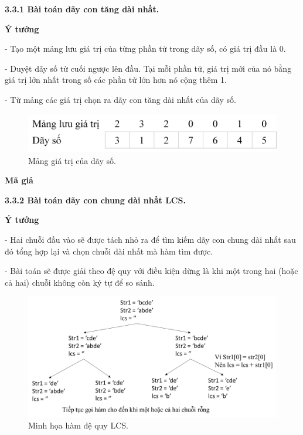 \setlength{\parindent}{0.5cm}
\textbf{3.3.1 Bài toán dãy con tăng dài nhất.}

\smallskip
{}
\changefontsizes{13pt}
\textbf{Ý tưởng}


\setlength{\parindent}{0cm}
- Tạo một mảng lưu giá trị của từng phần tử trong dãy số, có giá trị đầu là 0.

- Duyệt dãy số từ cuối ngược lên đầu. Tại mỗi phần tử, giá trị mới của nó bằng giá trị lớn nhất trong số các phần tử lớn hơn nó cộng thêm 1.

- Từ mảng các giá trị chọn ra dãy con tăng dài nhất của dãy số.


\begin{figure}[h!]
	\includegraphics[scale=0.2]{./image/LCS.png}
	\caption{Mảng giá trị của dãy số.}
\end{figure}



\setlength{\parindent}{0cm}
\textbf{Mã giả}

\smallskip
{}






\bigskip
\changefontsizes{14pt}
\setlength{\parindent}{0.5cm}
\textbf{3.3.2 Bài toán dãy con chung dài nhất LCS.}


\smallskip
{}
\changefontsizes{13pt}
\textbf{Ý tưởng}


\setlength{\parindent}{0cm}
- Hai chuỗi đầu vào sẽ được tách nhỏ ra để tìm kiếm dãy con chung dài nhất sau đó tổng hợp lại và chọn chuỗi dài nhất mà hàm tìm được.

- Bài toán sẽ được giải theo đệ quy với điều kiện dừng là khi một trong hai (hoặc cả hai) chuỗi không còn ký tự để so sánh.


\vspace{-0.5cm}
\begin{figure}[h!]
	\includegraphics[scale=0.3675]{./image/LCSo.png}
	\caption{Minh họa hàm đệ quy LCS.}
\end{figure}


